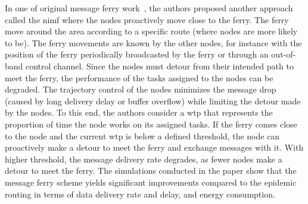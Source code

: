 In one of original message ferry work~\cite{zhao2004message}, the authors proposed another approach called the \acrfull{nimf} where the nodes proactively move close to the ferry. The ferry move around the area according to a specific route (where nodes are more likely to be). The ferry movements are known by the other nodes, for instance with the position of the ferry periodically broadcasted by the ferry or through an out-of-band control channel. Since the nodes must detour from their intended path to meet the ferry, the performance of the tasks assigned to the nodes can be degraded. The trajectory control of the nodes minimizes the message drop (caused by long delivery delay or buffer overflow) while limiting the detour made by the nodes. To this end, the authors consider a \acrfull{wtp} that represents the proportion of time the node works on its assigned tasks. If the ferry comes close to the node and the  current \acrshort{wtp} is below a defined threshold, the node can proactively make a detour to meet the ferry and exchange messages with it. With higher threshold, the message delivery rate degrades, as fewer nodes make a detour to meet the ferry. The simulations conducted in the paper show that the message ferry scheme yields significant improvements compared to the epidemic routing in terms of data delivery rate and delay, and energy consumption. 

